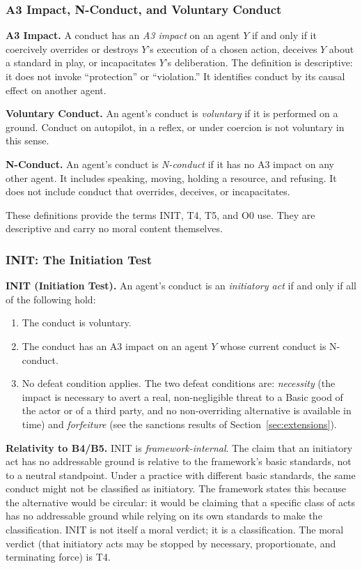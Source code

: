 \documentclass[11pt]{article}
\begin{document}
\subsubsection{A3 Impact, N-Conduct, and Voluntary Conduct}
\begin{paperbox}
\textbf{A3 Impact.} A conduct has an \emph{A3 impact} on an agent $Y$ if and only if it coercively overrides or destroys $Y$'s execution of a chosen action, deceives $Y$ about a standard in play, or incapacitates $Y$'s deliberation. The definition is descriptive: it does not invoke ``protection'' or ``violation.'' It identifies conduct by its causal effect on another agent.

\textbf{Voluntary Conduct.} An agent's conduct is \emph{voluntary} if it is performed on a ground. Conduct on autopilot, in a reflex, or under coercion is not voluntary in this sense.

\textbf{N-Conduct.} An agent's conduct is \emph{N-conduct} if it has no A3 impact on any other agent. It includes speaking, moving, holding a resource, and refusing. It does not include conduct that overrides, deceives, or incapacitates.
\end{paperbox}
These definitions provide the terms INIT, T4, T5, and O0 use. They are descriptive and carry no moral content themselves.

\subsubsection{INIT: The Initiation Test}
\begin{paperbox}
\textbf{INIT (Initiation Test).} An agent's conduct is an \emph{initiatory act} if and only if all of the following hold:
\begin{enumerate}[label=(\arabic*)]
\item The conduct is voluntary.
\item The conduct has an A3 impact on an agent $Y$ whose current conduct is N-conduct.
\item No defeat condition applies. The two defeat conditions are: \emph{necessity} (the impact is necessary to avert a real, non-negligible threat to a Basic good of the actor or of a third party, and no non-overriding alternative is available in time) and \emph{forfeiture} (see the sanctions results of Section~\ref{sec:extensions}).
\end{enumerate}
\end{paperbox}
\textbf{Relativity to B4/B5.} INIT is \emph{framework-internal}. The claim that an initiatory act has no addressable ground is relative to the framework's basic standards, not to a neutral standpoint. Under a practice with different basic standards, the same conduct might not be classified as initiatory. The framework states this because the alternative would be circular: it would be claiming that a specific class of acts has no addressable ground while relying on its own standards to make the classification. INIT is not itself a moral verdict; it is a classification. The moral verdict (that initiatory acts may be stopped by necessary, proportionate, and terminating force) is T4.
\end{document}
